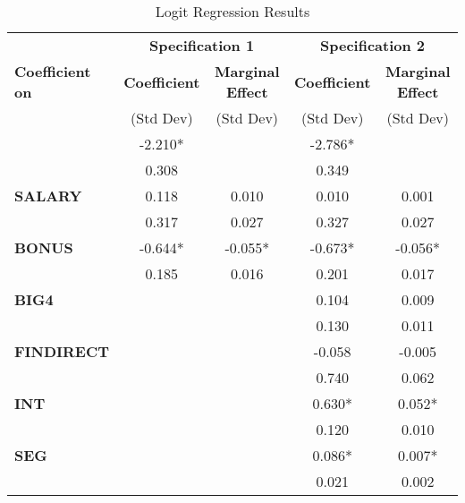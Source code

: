 \begin{table}[t]
\caption{Logit Regression Results} \label{tab:logit}
\begin{center}
\begin{tabular}{|l|cc|cc|}
\hline
             & \multicolumn{2}{c|}{\bf Specification 1}  &  \multicolumn{2}{c|}{\bf Specification 2}   \\
 {\bf Coefficient on}  &  {\bf Coefficient} & {\bf Marginal Effect} & {\bf Coefficient} & {\bf Marginal Effect}  \\ 
          &  (Std Dev)  & (Std Dev) &  (Std Dev)  & (Std Dev) \\ \hline
\T {\bf Intercept} &   -2.210*   &   & -2.786*   &    \\
                   &   0.308   &   & 0.349   &   \\[.6em]
 {\bf SALARY}    &   0.118    &  0.010  & 0.010    &  0.001   \\
                   &   0.317   &  0.027 & 0.327   &  0.027 \\[.6em]
 {\bf BONUS}  &   -0.644*   &  -0.055* & -0.673*   &  -0.056*  \\
                   &   0.185   &  0.016 & 0.201   &  0.017 \\[.6em]
 {\bf BIG4 }  &       &    & 0.104    &  0.009   \\
                   &      &   & 0.130   &  0.011 \\[.6em]
 {\bf FINDIRECT}  &       &    & -0.058    &  -0.005   \\
                   &      &   & 0.740   &  0.062 \\[.6em]
 {\bf INT }  &       &    & 0.630*   &  0.052*  \\
                   &      &   & 0.120   &  0.010 \\[.6em]
 {\bf SEG}  &       &    & 0.086*   &  0.007*  \\
                   &      &   & 0.021   &  0.002 \\[.6em]
\hline
\end{tabular}
\end{center}
\end{table}

